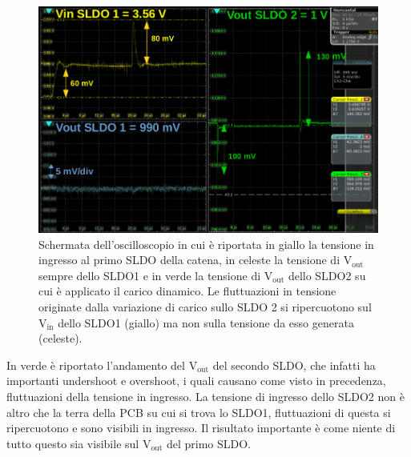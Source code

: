\begin{figure}[h!]
\centering
\includegraphics[scale=.32]{Immagini/ScreenSerie}
\caption{Schermata dell'oscilloscopio in cui è riportata in giallo la tensione in ingresso al primo SLDO della catena,  in celeste la tensione di $\mathrm{V_{out}}$ sempre dello SLDO1 e in verde la tensione di $\mathrm{V_{out}}$ dello SLDO2 su cui è applicato il carico dinamico. Le fluttuazioni in tensione originate dalla variazione di carico sullo SLDO 2 si ripercuotono sul $\mathrm{V_{in}}$ dello SLDO1 (giallo) ma non sulla tensione da esso generata (celeste).}
\label{ScreenSerie}
\end{figure}
In verde è riportato l'andamento del $\mathrm{V_{out}}$ del secondo SLDO, che infatti ha importanti undershoot e overshoot, i quali causano come visto in precedenza, fluttuazioni della tensione in ingresso. 
La tensione di ingresso dello SLDO2 non è altro che la terra della PCB su cui si trova lo SLDO1, fluttuazioni di questa si ripercuotono e sono visibili in ingresso. 
Il risultato importante è come niente di tutto questo sia visibile sul $\mathrm{V_{out}}$ del primo SLDO.
